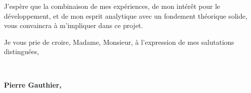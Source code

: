 \documentclass{cv_style}
\begin{document}
J'espère que la combinaison de mes expériences, de mon intérêt pour le développement, et de mon esprit analytique avec un fondement théorique solide, vous convaincra à m’impliquer dans ce projet.

Je vous prie de croire, Madame, Monsieur, à l’expression de mes salutations distinguées, 

\\
\vspace{1cm}
\begin{flushright}
\parbox{5cm}{
\centering
    \textbf{Pierre Gauthier,}
}
\end{flushright}
\end{document}
